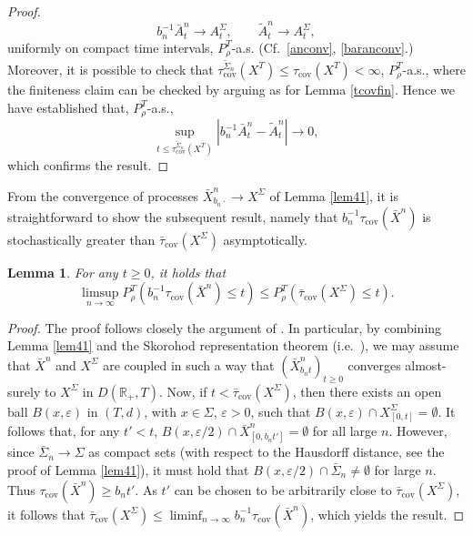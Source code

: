 \documentclass[a4paper, 11pt]{article}
\newtheorem{lem}[theorem]{Lemma}
\begin{document}
\begin{proof}
\[b_n^{-1}\bar A^n_t\rightarrow A^\Sigma_t, \qquad \tilde A^n_t\rightarrow A^\Sigma_t,\]
uniformly on compact time intervals, $P_\rho^T$-a.s. (Cf.\ \eqref{anconv}, \eqref{baranconv}.) Moreover, it is possible to check that $\tau_{\mathrm{cov}}^{\tilde{\Sigma}_n}(X^T)\leq \tau_{\mathrm{cov}}(X^T)<\infty$, $P_\rho^T$-a.s., where the finiteness claim can be checked by arguing as for Lemma \ref{tcovfin}. Hence we have established that, $P_\rho^T$-a.s.,
\[\sup_{t\leq \tau_{\mathrm{cov}}^{\tilde{\Sigma}_n}(X^T)}\left|b_n^{-1}\bar A^n_t-\tilde{A}^n_t\right|\rightarrow 0,\]
which confirms the result.
\end{proof}

From the convergence of processes $\bar{X}^n_{b_n\cdot}\rightarrow X^\Sigma$ of Lemma \ref{lem41}, it is straightforward to show the subsequent result, namely that $b_n^{-1}\tau_{\mathrm{cov}}(\bar{X}^n)$ is stochastically greater than $\bar\tau_{\mathrm{cov}}({X}^\Sigma)$ asymptotically.

\begin{lem}\label{lem44} For any $t\geq 0$, it holds that
\[\limsup_{n\rightarrow\infty}P_\rho^T\left(b_n^{-1}\tau_{\mathrm{cov}}(\bar{X}^n)\leq t\right)\leq P_\rho^T\left(\bar\tau_{\mathrm{cov}}({X}^\Sigma)\leq t\right).\]
\end{lem}
\begin{proof} The proof follows closely the argument of \cite[Corollary 7.3]{CLLT}. In particular, by combining Lemma \ref{lem41} and the Skorohod representation theorem (i.e.\ \cite[Theorem 4.30]{Kall}), we may assume that $\bar{X}^n$ and $X^\Sigma$ are coupled in such a  way that $(\bar{X}^n_{b_nt})_{t\geq 0}$ converges almost-surely to $X^\Sigma$ in $D(\mathbb{R}_+,T)$. Now, if $t<\bar\tau_{\mathrm{cov}}({X}^\Sigma)$, then there exists an open ball $B(x,\varepsilon)$ in $(T,d)$, with $x\in\Sigma$, $\varepsilon>0$,  such that $B(x,\varepsilon)\cap {X}^\Sigma_{[0,t]}=\emptyset$. It follows that, for any $t'<t$, $B(x,\varepsilon/2)\cap \bar{X}^n_{[0,b_nt']}=\emptyset$ for all large $n$. However, since $\bar{\Sigma}_n\rightarrow \Sigma$ as compact sets (with respect to the Hausdorff distance, see the proof of Lemma \ref{lem41}), it must hold that $B(x,\varepsilon/2)\cap\bar{\Sigma}_n\neq \emptyset$ for large $n$. Thus $\tau_{\mathrm{cov}}( \bar{X}^n)\geq b_nt'$. As $t'$ can be chosen to be arbitrarily close to $\bar\tau_{\mathrm{cov}}({X}^\Sigma)$, it follows that $\bar\tau_{\mathrm{cov}}({X}^\Sigma)\leq \liminf_{n\rightarrow\infty}b_n^{-1}\tau_{\mathrm{cov}}( \bar{X}^n)$, which yields the result.
\end{proof}
\end{document}

